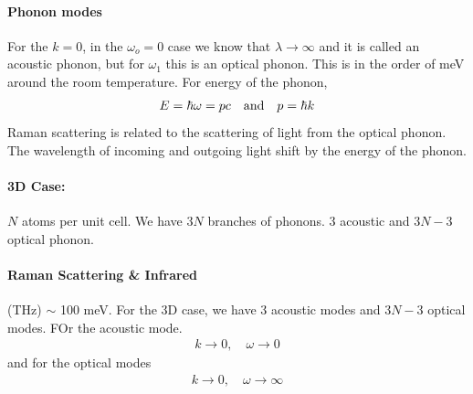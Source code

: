 \documentclass[../main.tex]{subfiles}
\begin{document}
\paragraph{Phonon modes} For the $k=0$, in the $\omega_o = 0$ case we know that
$\lambda \to \infty$ and it is called an acoustic phonon, but for $\omega_1$ this is an optical 
phonon. This is in the order of meV around the room temperature. For energy of the phonon,
\begin{align*}
    E = \hbar \omega = pc \qand p = \hbar k
\end{align*}
Raman scattering is related to the scattering of light from the optical phonon. The wavelength of
incoming and outgoing light shift by the energy of the phonon.

\paragraph{3D Case:} $N$ atoms per unit cell. We have $3N$ branches of phonons. 3 acoustic and
$3N - 3$ optical phonon.

\paragraph*{Raman Scattering \& Infrared} (THz) $\sim$ 100 meV.
For the 3D case, we have 3 acoustic modes and $3N - 3$ optical modes. FOr the acoustic mode.
\begin{align*}
    k \to 0, \quad \omega \to 0
\end{align*}
and for the optical modes
\begin{align*}
    k \to 0, \quad \omega \to \infty
\end{align*}
\end{document}
